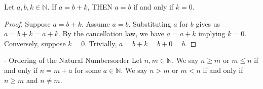 \begin{lemma}
    \label{lemma:equality}
    Let $a, b, k \in \mathbb{N}.$
    If $a = b + k$, THEN $a = b$ if and only if $k = 0.$
\end{lemma}
\begin{proof}
    Suppose $a = b + k.$ 
    Assume $a = b.$
    Substituting $a$ for $b$ gives us $a = b + k = a + k.$ 
    By the cancellation law, we have $a = a +k$ implying $k = 0.$
    Conversely, suppose $k = 0.$ Trivially, $a = b + k = b + 0 = b.$
\end{proof}
\begin{definition}{-  Ordering of the Natural Numbers}{order}
    Let $n, m \in \mathbb{N}.$ 
    We say $n \geq m$ or $m \leq n$ if and only if $n = m + a$ for some $a \in \mathbb{N}.$
    We say $n > m$ or $m < n$ if and only if $n \geq m$ and $n \neq m.$
\end{definition}

